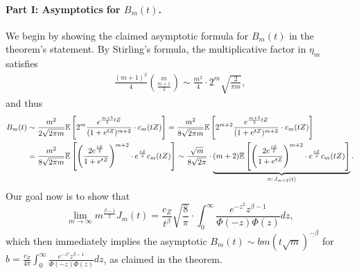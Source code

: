 \paragraph{Part I: Asymptotics for $B_m(t)$.}
We begin by showing the claimed asymptotic formula for $B_m(t)$ in
the theorem's statement.
By Stirling's formula, the multiplicative factor in $\eta_m$ satisfies
\begin{align*}
	\frac{(m+1)^2}{4} \binom{m}{\frac{m+1}{2}} \sim \frac{m^2}{4} \cdot 2^m \sqrt{\frac{2}{\pi m}},
\end{align*}
and thus
\begin{align*}
	B_m(t) &\sim \frac{m^2}{2 \sqrt{2 \pi m}} \mathbb{E} \left[{2^m \frac{e^{\frac{m+3}{2}tZ}}{(1+e^{tZ})^{m+2}} \cdot c_m(tZ)}\right] = \frac{m^2}{8 \sqrt{2 \pi m}} \mathbb{E} \left[{2^{m+2} \frac{e^{\frac{m+3}{2}tZ}}{(1+e^{tZ})^{m+2}} \cdot c_m(tZ)}\right] \nonumber \\
	& = \frac{m^2}{8 \sqrt{2 \pi m}} \mathbb{E} \left[{\left({\frac{2 e^{\frac{tZ}{2}}}{1 + e^{tZ}}}\right)^{m+2}\cdot e^{\frac{tZ}{2}} c_m(tZ)}\right] \sim \frac{\sqrt{m}}{8\sqrt{2\pi}} \cdot \underbrace{(m+2) \mathbb{E} \left[{\left({\frac{2 e^{\frac{tZ}{2}}}{1 + e^{tZ}}}\right)^{m+2}\cdot e^{\frac{tZ}{2}} c_m(tZ)}\right]}_{=:J_{m+2}(t)}.
\end{align*}
Our goal now is to show that
\begin{equation}
  \label{eqn:J-m-limit-term}
  \lim_{m \to \infty} m^{\frac{\beta - 1}{2}}
  J_m(t)
  = \frac{c_Z}{t^\beta} \sqrt{\frac{8}{\pi}}
  \cdot \int_0^\infty \frac{e^{-z^2} z^{\beta - 1}}{\Phi(-z) \Phi(z)} dz,
\end{equation}
which then immediately implies the asymptotic
$B_m(t) \sim b m (t \sqrt{m})^{-\beta}$
for $b = \frac{c_Z}{4\pi} \int_0^\infty \frac{e^{-z^2} z^{\beta - 1}}{
  \Phi(-z) \Phi(z)} dz$, as claimed in the theorem.

